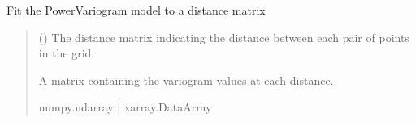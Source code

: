 \documentclass[letterpaper,10pt,english]{sphinxmanual}
\begin{document}
\begin{fulllineitems}
\begin{fulllineitems}
\label{\detokenize{covariance:glomar_gridding.variogram.PowerVariogram.fit}}
\pysigstartsignatures
\pysiglinewithargsret
{}
{}
{}
\pysigstopsignatures
\sphinxAtStartPar
Fit the PowerVariogram model to a distance matrix
\begin{quote}\begin{description}
\sphinxAtStartPar
{} (\sphinxstyleliteralemphasis{\sphinxupquote{ | }}) \textendash{} The distance matrix indicating the distance between each pair of
points in the grid.

\sphinxAtStartPar
A matrix containing the variogram values at each distance.

\sphinxAtStartPar
numpy.ndarray | xarray.DataArray

\end{description}\end{quote}

\end{fulllineitems}


\end{fulllineitems}

\end{document}
